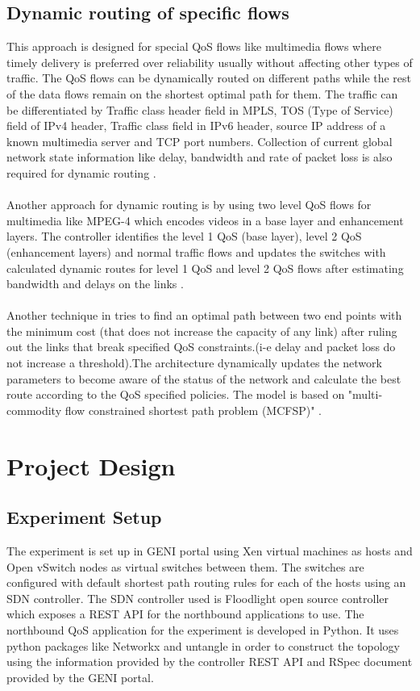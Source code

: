 \documentclass[paper=a4, fontsize=12pt]{scrartcl}	%
\numberwithin{equation}{section}		%
\numberwithin{figure}{section}			%
\numberwithin{table}{section}				%
\begin{document}
\subsection{Dynamic routing of specific flows}
This approach is designed for special QoS flows like multimedia flows where timely delivery is preferred over reliability usually without affecting other types of traffic. The QoS flows can be dynamically routed on different paths while the rest of the data flows remain on the shortest optimal path for them. The traffic can be differentiated by Traffic class header field in MPLS, TOS (Type of Service) field of IPv4 header, Traffic class field in IPv6 header, source IP address of a known multimedia server and TCP port numbers. Collection of current global network state information like delay, bandwidth and rate of packet loss is also required for dynamic routing \cite{openqos}.
\\
\\
Another approach for dynamic routing is by using two level QoS flows for multimedia like MPEG-4 which encodes videos in a base layer and enhancement layers. The controller identifies the level 1 QoS (base layer), level 2 QoS (enhancement layers) and normal traffic flows and updates the switches with calculated dynamic routes for level 1 QoS and level 2 QoS flows after estimating bandwidth and delays on the links \cite{video}.
\\
\\
Another technique in \cite{thesis} tries to find an optimal path between two end points with the minimum cost (that does not increase the capacity of any link) after ruling out the links that break specified QoS constraints.(i-e delay and packet loss do not increase a threshold).The architecture dynamically updates the network parameters to become aware of the status of the network and calculate the best route according to the QoS specified policies. The model is based on "multi-commodity flow constrained shortest path problem (MCFSP)" .

\section{Project Design}
\subsection{Experiment Setup}
The experiment is set up in GENI portal using Xen virtual machines as hosts and Open vSwitch nodes as virtual switches between them. The switches are configured with default shortest path routing rules for each of the hosts using an SDN controller. The SDN controller used is Floodlight open source controller which exposes a REST API for the northbound applications to use. The northbound QoS application for the experiment is developed in Python. It uses python packages like Networkx and untangle in order to construct the topology using the information provided by the controller REST API and RSpec document provided by the GENI portal. 
\end{document}
